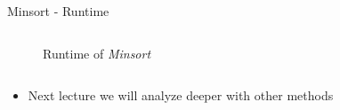 \begin{frame}{Minsort - Runtime}
\begin{columns}
\begin{column}[t]{0.45\textwidth}
\begin{center}
\begin{figure}[!h]
          \vspace*{-1.0em}\caption{Runtime of \textit{Minsort}}%
          \label{fig:minsort_runtime_2}%
        \end{figure}%
      \end{center}
    \end{column}%
  \end{columns}
  \begin{columns}
    \begin{column}{1.0\textwidth}
      \begin{itemize}
        \item<3- |handout:1>
          Next lecture we will analyze deeper with other methods
      \end{itemize}
    \end{column}
    \begin{column}{0.0\textwidth}\end{column}
  \end{columns}
\end{frame}
